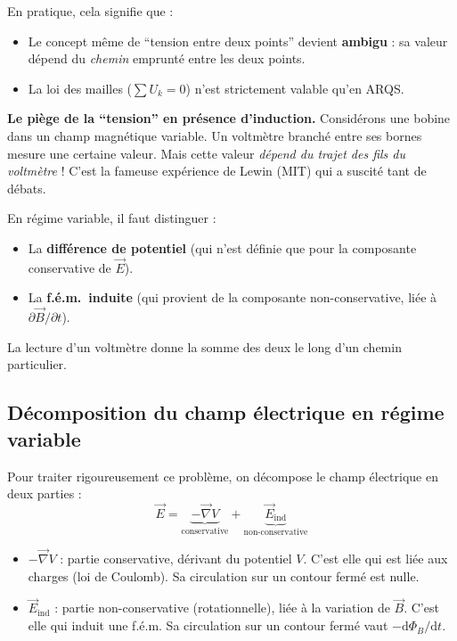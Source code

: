 \documentclass[12pt,a4paper,twoside]{book}
\begin{document}
En pratique, cela signifie que :
\begin{itemize}[nosep]
\item Le concept même de ``tension entre deux points'' devient \textbf{ambigu} : sa valeur dépend du \textit{chemin} emprunté entre les deux points.
\item La loi des mailles ($\sum U_k = 0$) n'est strictement valable qu'en ARQS.
\end{itemize}

\begin{attention}
\textbf{Le piège de la ``tension'' en présence d'induction.} Considérons une bobine dans un champ magnétique variable. Un voltmètre branché entre ses bornes mesure une certaine valeur. Mais cette valeur \textit{dépend du trajet des fils du voltmètre} ! C'est la fameuse expérience de Lewin (MIT) qui a suscité tant de débats.

En régime variable, il faut distinguer :
\begin{itemize}[nosep]
\item La \textbf{différence de potentiel} (qui n'est définie que pour la composante conservative de $\vec{E}$).
\item La \textbf{f.é.m.\ induite} (qui provient de la composante non-conservative, liée à $\partial\vec{B}/\partial t$).
\end{itemize}
La lecture d'un voltmètre donne la somme des deux le long d'un chemin particulier.
\end{attention}

\subsection{Décomposition du champ électrique en régime variable}

Pour traiter rigoureusement ce problème, on décompose le champ électrique en deux parties :
\[
\vec{E} = \underbrace{-\vec{\nabla}V}_{\text{conservative}} + \underbrace{\vec{E}_{\text{ind}}}_{\text{non-conservative}}
\]

\begin{itemize}[nosep]
\item $-\vec{\nabla}V$ : partie conservative, dérivant du potentiel $V$. C'est elle qui est liée aux charges (loi de Coulomb). Sa circulation sur un contour fermé est nulle.
\item $\vec{E}_{\text{ind}}$ : partie non-conservative (rotationnelle), liée à la variation de $\vec{B}$. C'est elle qui induit une f.é.m. Sa circulation sur un contour fermé vaut $-\mathrm{d}\Phi_B/\mathrm{d}t$.
\end{itemize}
\end{document}
